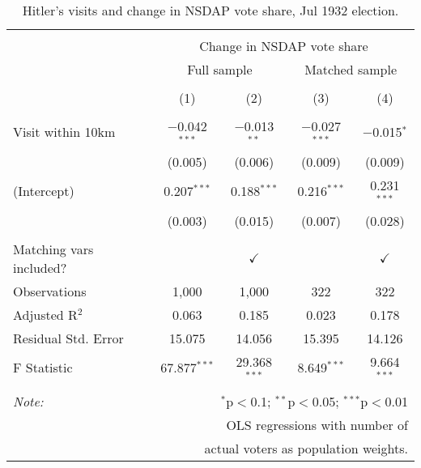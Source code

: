 
\begin{table}[!htbp] \centering 
  \caption{Hitler's visits and change in NSDAP vote share, Jul 1932 election.} 
  \label{tab:ols-d_p_nsdap-2} 
\begin{tabular}{@{\extracolsep{5pt}}lcccc} 
\\[-1.8ex]\hline 
\hline \\[-1.8ex] 
 & \multicolumn{4}{c}{Change in NSDAP vote share} \\ 
\cline{2-5} 
 & \multicolumn{2}{c}{Full sample} & \multicolumn{2}{c}{Matched sample} \\ 
\\[-1.8ex] & (1) & (2) & (3) & (4)\\ 
\hline \\[-1.8ex] 
 Visit within 10km & $-$0.042$^{***}$ & $-$0.013$^{**}$ & $-$0.027$^{***}$ & $-$0.015$^{*}$ \\ 
  & (0.005) & (0.006) & (0.009) & (0.009) \\ 
  (Intercept) & 0.207$^{***}$ & 0.188$^{***}$ & 0.216$^{***}$ & 0.231$^{***}$ \\ 
  & (0.003) & (0.015) & (0.007) & (0.028) \\ 
 \hline \\[-1.8ex] 
Matching vars included? &  & \multicolumn{1}{c}{$\checkmark$} &  & \multicolumn{1}{c}{$\checkmark$} \\ 
Observations & 1,000 & 1,000 & 322 & 322 \\ 
Adjusted R$^{2}$ & 0.063 & 0.185 & 0.023 & 0.178 \\ 
Residual Std. Error & 15.075 & 14.056 & 15.395 & 14.126 \\ 
F Statistic & 67.877$^{***}$ & 29.368$^{***}$ & 8.649$^{***}$ & 9.664$^{***}$ \\ 
\hline 
\hline \\[-1.8ex] 
\textit{Note:}  & \multicolumn{4}{r}{$^{*}$p$<$0.1; $^{**}$p$<$0.05; $^{***}$p$<$0.01} \\ 
 & \multicolumn{4}{r}{OLS regressions with number of} \\ 
 & \multicolumn{4}{r}{actual voters as population weights.} \\ 
\end{tabular} 
\end{table} 
